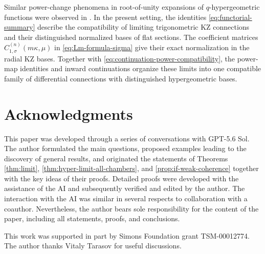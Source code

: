 \documentclass[12pt]{amsart}
\theoremstyle{definition}
\numberwithin{equation}{section}
\theoremstyle{definition}
\let\ka\kappa
\let\si\sigma
\begin{document}
Similar power-change phenomena in root-of-unity expansions
of $q$-hypergeometric functions were observed in \cite{GW25}.
In the present setting, the identities
\eqref{eq:functorial-summary} describe the compatibility of
limiting trigonometric KZ connections and their distinguished
normalized bases of flat sections. The coefficient matrices
$C_{1,\si}^{(n)}(m\ka,\mu)$ in
\eqref{eq:Lm-formula-sigma} give their exact normalization in
the radial KZ bases. Together with
\eqref{eq:continuation-power-compatibility}, the power-map
identities and inward continuations organize these limits into
one compatible family of differential connections with
distinguished hypergeometric bases.

\section*{Acknowledgments}
This paper was developed through a series of conversations with GPT-5.6 Sol. 
The author formulated the main questions, proposed examples leading to the discovery of general results, and originated the statements of Theorems \ref{thm:limit}, \ref{thm:hyper-limit-all-chambers}, and \ref{prop:if-weak-coherence} together with the key ideas of their proofs. Detailed proofs were developed with the assistance of the AI and subsequently verified and edited by the author. The interaction with the AI was similar in several respects to collaboration with a coauthor. Nevertheless, the author bears sole responsibility for the content of the paper, including all statements, proofs, and conclusions.
\smallskip

This work was supported in part by Simons Foundation grant TSM-00012774.
The author thanks Vitaly Tarasov for useful discussions.
\end{document}

